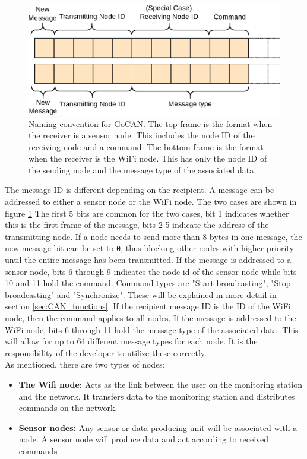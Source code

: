 \begin{figure}[h!]
	\centering
	\includegraphics[width = 0.9\linewidth]{graphics/CAN_protocol_general}
	\caption[Naming convention for GoCAN.]{Naming convention for GoCAN.
	The top frame is the format when the receiver is a sensor node.
	This includes the node ID of the receiving node and a command.
	The bottom frame is the format when the receiver is the WiFi node.
	This has only the node ID of the sending node and the message type of the associated data.}
	\label{fig:CAN_protocol_general}
\end{figure}
The message ID is different depending on the recipient. 
A message can be addressed to either a sensor node or the WiFi node.
The two cases are shown in figure \ref{fig:CAN_protocol_general}
The first 5 bits are common for the two cases, bit 1 indicates whether this is the first frame of the message, bits 2-5 indicate the address of the transmitting node.
If a node needs to send more than 8 bytes in one message, the new message bit can be set to \texttt{0}, thus blocking other nodes with higher priority until the entire message has been transmitted.
If the message is addressed to a sensor node, bits 6 through 9 indicates the node id of the sensor node while bits 10 and 11 hold the command.
Command types are "Start broadcasting", "Stop broadcasting" and "Synchronize".
These will be explained in more detail in section \ref{sec:CAN_functions}.
If the recipient message ID is the ID of the WiFi node, then the command applies to all nodes.
If the message is addressed to the WiFi node, bits 6 through 11 hold the message type of the associated data.
This will allow for up to 64 different message types for each node.
It is the responsibility of the developer to utilize these correctly.\\

As mentioned, there are two types of nodes: 
\begin{itemize}
	\item \textbf{The Wifi node:} Acts as the link between the user on the monitoring station and the network.
	It transfers data to the monitoring station and distributes commands on the network.
	\item \textbf{Sensor nodes:} Any sensor or data producing unit will be associated with a node.
	A sensor node will produce data and act according to received commands
\end{itemize}


